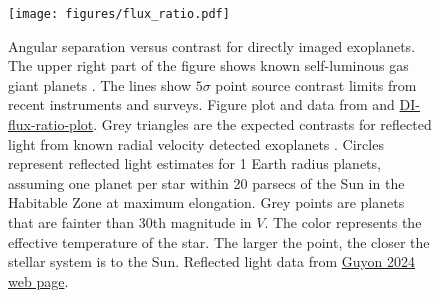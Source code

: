 \documentclass[letterpaper]{ar-1col}
\newcommand{\ld}{$\lambda/D$}
\begin{document}
\begin{figure}[ht]
  \centering
  \texttt{[image: figures/flux\_ratio.pdf]}
  \caption{Angular separation versus contrast for directly imaged exoplanets.
  The upper right part of the figure shows known self-luminous gas giant planets \citep{Lacy20}.
  The lines show  $5\sigma$ point source contrast limits from recent instruments and surveys.
  Figure plot and data from \citet{Bailey24} and \href{https://github.com/nasavbailey/DI-flux-ratio-plot}{DI-flux-ratio-plot}.
  Grey triangles are the expected contrasts for reflected light from known radial velocity detected exoplanets \citep{Bataltha18}.
  Circles represent reflected light estimates for 1 Earth radius planets, assuming one planet per star within 20 parsecs of the Sun in the Habitable Zone at maximum elongation.
  Grey points are planets that are fainter than 30th magnitude in $V$.
  The color represents the effective temperature of the star.
  The larger the point, the closer the stellar system is to the Sun.
  Reflected light data from \href{https://subarutelescope.org/staff/guyon/04research.web/14hzplanetsELTs.web/catalog.web/content.html}{Guyon 2024 web page}.  
}
\end{figure}
\end{document}
